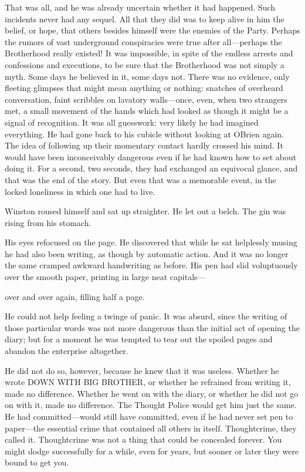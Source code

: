 That was all, and he was already uncertain whether it had happened. Such
incidents never had any sequel. All that they did was to keep alive in
him the belief, or hope, that others besides himself were the enemies of
the Party. Perhaps the rumors of vast underground conspiracies were true
after all---perhaps the Brotherhood really existed! It was impossible,
in spite of the endless arrests and confessions and executions, to be
sure that the Brotherhood was not simply a myth. Some days he believed
in it, some days not. There was no evidence, only fleeting glimpses that
might mean anything or nothing: snatches of overheard conversation,
faint scribbles on lavatory walls---once, even, when two strangers met,
a small movement of the hands which had looked as though it might be a
signal of recognition. It was all guesswork: very likely he had imagined
everything. He had gone back to his cubicle without looking at
O\textquotesingle Brien again. The idea of following up their momentary
contact hardly crossed his mind. It would have been inconceivably
dangerous even if he had known how to set about doing it. For a second,
two seconds, they had exchanged an equivocal glance, and that was the
end of the story. But even that was a memorable event, in the locked
loneliness in which one had to live.

Winston roused himself and sat up straighter. He let out a belch. The
gin was rising from his stomach.

His eyes refocused on the page. He discovered that while he sat
helplessly musing he had also been writing, as though by automatic
action. And it was no longer the same cramped awkward handwriting as
before. His pen had slid voluptuously over the smooth paper, printing in
large neat capitals---


over and over again, filling half a page.

He could not help feeling a twinge of panic. It was absurd, since the
writing of those particular words was not more dangerous than the
initial act of opening the diary; but for a moment he was tempted to
tear out the spoiled pages and abandon the enterprise altogether.

He did not do so, however, because he knew that it was useless. Whether
he wrote DOWN WITH BIG BROTHER, or whether he refrained from writing it,
made no difference. Whether he went on with the diary, or whether he did
not go on with it, made no difference. The Thought Police would get him
just the same. He had committed---would still have committed, even if he
had never set pen to paper---the essential crime that contained all
others in itself. Thoughtcrime, they called it. Thoughtcrime was not a
thing that could be concealed forever. You might dodge successfully for
a while, even for years, but sooner or later they were bound to get you.

